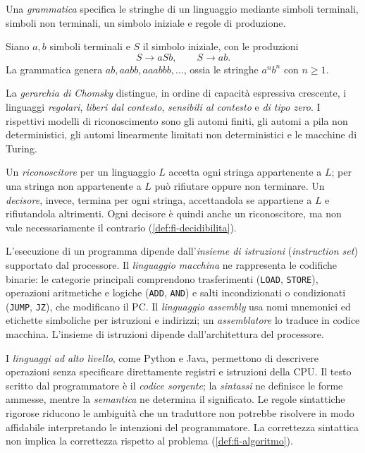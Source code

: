 Una \emph{grammatica} specifica le stringhe di un linguaggio mediante
simboli terminali, simboli non terminali, un simbolo iniziale e
regole di produzione.

\clearpage

\begin{example}
Siano \(a,b\) simboli terminali e \(S\) il simbolo iniziale,
con le produzioni
\[
  S\to aSb,\qquad S\to ab.
\]
La grammatica genera \(ab,aabb,aaabbb,\ldots\), ossia le stringhe
\(a^nb^n\) con \(n\ge1\).
\end{example}

La \emph{gerarchia di Chomsky} distingue, in ordine di capacità
espressiva crescente, i linguaggi \emph{regolari}, \emph{liberi dal
contesto}, \emph{sensibili al contesto} e \emph{di tipo zero}.
I rispettivi modelli di riconoscimento sono gli automi finiti,
gli automi a pila non deterministici, gli automi linearmente
limitati non deterministici e le macchine di Turing.

Un \emph{riconoscitore} per un linguaggio \(L\) accetta ogni stringa
appartenente a \(L\); per una stringa non appartenente a \(L\)
può rifiutare oppure non terminare. Un \emph{decisore}, invece,
termina per ogni stringa, accettandola se appartiene a \(L\)
e rifiutandola altrimenti. Ogni decisore è quindi anche un
riconoscitore, ma non vale necessariamente il contrario
(\cref{def:fi-decidibilita}).

L'esecuzione di un programma dipende dall'\emph{insieme di istruzioni}
(\emph{instruction set}) supportato dal processore. Il
\emph{linguaggio macchina} ne rappresenta le codifiche binarie:
le categorie principali comprendono trasferimenti (\texttt{LOAD},
\texttt{STORE}), operazioni aritmetiche e logiche (\texttt{ADD},
\texttt{AND}) e salti incondizionati o condizionati
(\texttt{JUMP}, \texttt{JZ}), che modificano il PC.
Il \emph{linguaggio assembly} usa nomi mnemonici ed etichette
simboliche per istruzioni e indirizzi; un \emph{assemblatore} lo
traduce in codice macchina. L'insieme di istruzioni dipende
dall'architettura del processore.

I \emph{linguaggi ad alto livello}, come Python e Java, permettono
di descrivere operazioni senza specificare direttamente registri
e istruzioni della CPU. Il testo scritto dal programmatore è il
\emph{codice sorgente}; la \emph{sintassi} ne definisce le forme
ammesse, mentre la \emph{semantica} ne determina il significato.
Le regole sintattiche rigorose riducono le ambiguità che un traduttore
non potrebbe risolvere in modo affidabile interpretando le intenzioni
del programmatore. La correttezza sintattica non implica la
correttezza rispetto al problema (\cref{def:fi-algoritmo}).


